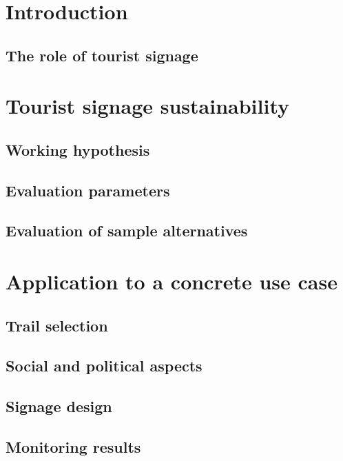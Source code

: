 \documentclass[sustainability,article,submit,pdftex,moreauthors]{Definitions/mdpi}
\begin{document}

\section{Introduction}


\subsection{The role of tourist signage}

\section{Tourist signage sustainability}

\subsection{Working hypothesis}

\subsection{Evaluation parameters}

\subsection{Evaluation of sample alternatives}

\section{Application to a concrete use case}

\subsection{Trail selection}

\subsection{Social and political aspects}

\subsection{Signage design}

\subsection{Monitoring results}
\end{document}
